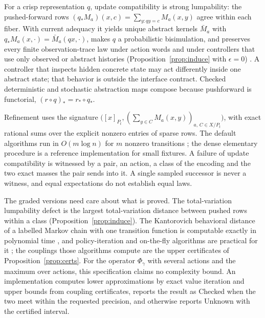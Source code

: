 \documentclass[11pt]{article}
\theoremstyle{definition}
\theoremstyle{plain}
\begin{document}
For a crisp representation $q$, update compatibility is strong lumpability: the pushed-forward
rows $(q_*M_a)(x,c)=\sum_{y:qy=c}M_a(x,y)$ agree within each fiber. With current adequacy it
yields unique abstract kernels $\bar M_a$ with $q_*M_a(x,\cdot)=\bar M_a(qx,\cdot)$, makes $q$ a
probabilistic bisimulation, and preserves every finite observation-trace law under action words
and under controllers that use only observed or abstract histories (Proposition~\ref{prop:induce}
with $\epsilon=0$) \cite{kemenysnell,larsenskou}. A controller that inspects hidden concrete state
may act differently inside one abstract state; that behavior is outside the interface contract.
Checked deterministic and stochastic abstraction maps compose because pushforward is functorial,
$(r\circ q)_*=r_*\circ q_*$.

Refinement uses the signature $\bigl([x]_{P_t},(\sum_{y\in C}M_a(x,y))_{a,\,C\in X/P_t}\bigr)$, with
exact rational sums over the explicit nonzero entries of sparse rows. The default algorithms run in
$O(m\log n)$ for $m$ nonzero transitions \cite{derisavi,valmari}; the dense elementary procedure is
a reference implementation for small fixtures. A failure of update compatibility is witnessed by a
pair, an action, a class of the encoding and the two exact masses the pair sends into it. A single
sampled successor is never a witness, and equal expectations do not establish equal laws.

The graded versions need care about what is proved. The total-variation lumpability defect is the
largest total-variation distance between pushed rows within a class
(Proposition~\ref{prop:induce}). The Kantorovich behavioral distance of a labelled Markov chain with
one transition function is computable exactly in polynomial time \cite{chenvbw}, and
policy-iteration and on-the-fly algorithms are practical for it \cite{tangvb,bacci}; the couplings
those algorithms compute are the upper certificates of Proposition~\ref{prop:certs}. For the
operator $\Phi_\gamma$ with several actions and the maximum over actions, this specification
claims no complexity bound. An implementation computes lower approximations by exact value
iteration and upper bounds from coupling certificates, reports the result as Checked when the two
meet within the requested precision, and otherwise reports Unknown with the certified interval.
\end{document}
